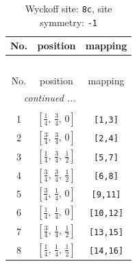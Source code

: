\documentclass[fleqn,8pt]{jsarticle}
\begin{document}
\renewcommand{\arraystretch}{1.2}
\begin{longtable}{ccc}
\caption{Wyckoff site: {\tt 8c}, site symmetry: {\tt -1}}
 \\
 \hline \hline
No. & position & mapping \\ \hline \endfirsthead

\multicolumn{2}{l}{\tablename\ \thetable{}} \\
 \hline \hline
No. & position & mapping \\ \hline \endhead

 \hline \hline
\multicolumn{2}{r}{\footnotesize\it continued ...} \\ \endfoot

 \hline \hline
\multicolumn{2}{r}{} \\ \endlastfoot

1 & $\left[ \frac{1}{4},\, \frac{3}{4},\, 0 \right]$ & {\tt [1,3]} \\ \hline
2 & $\left[ \frac{3}{4},\, \frac{3}{4},\, 0 \right]$ & {\tt [2,4]} \\ \hline
3 & $\left[ \frac{1}{4},\, \frac{3}{4},\, \frac{1}{2} \right]$ & {\tt [5,7]} \\ \hline
4 & $\left[ \frac{3}{4},\, \frac{3}{4},\, \frac{1}{2} \right]$ & {\tt [6,8]} \\ \hline
5 & $\left[ \frac{3}{4},\, \frac{1}{4},\, 0 \right]$ & {\tt [9,11]} \\ \hline
6 & $\left[ \frac{1}{4},\, \frac{1}{4},\, 0 \right]$ & {\tt [10,12]} \\ \hline
7 & $\left[ \frac{3}{4},\, \frac{1}{4},\, \frac{1}{2} \right]$ & {\tt [13,15]} \\ \hline
8 & $\left[ \frac{1}{4},\, \frac{1}{4},\, \frac{1}{2} \right]$ & {\tt [14,16]} \\
\end{longtable}
\renewcommand{\arraystretch}{1.2}
\end{document}
